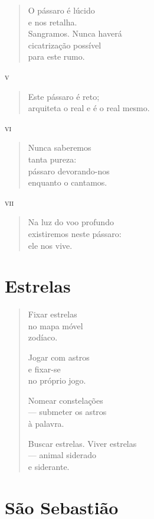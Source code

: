 \begin{verse}
O pássaro é lúcido\\
e nos retalha.\\
Sangramos. Nunca haverá\\
cicatrização possível\\
para este rumo.
\end{verse}

\medskip
\textsc{v}

\begin{verse}
Este pássaro é reto;\\
arquiteta o real e é o real mesmo.
\end{verse}

\medskip
\textsc{vi}

\begin{verse}
Nunca saberemos\\
tanta pureza:\\
pássaro devorando-nos\\
enquanto o cantamos.
\end{verse}

\medskip
\textsc{vii}

\begin{verse}
Na luz do voo profundo\\
existiremos neste pássaro:\\
ele nos vive.
\end{verse}

\chapter{Estrelas}

\begin{verse}
Fixar estrelas\\
no mapa móvel\\
zodíaco.

Jogar com astros\\
e fixar-se\\
no próprio jogo.

Nomear constelações\\
---  submeter os astros\\
à palavra.

Buscar estrelas. Viver estrelas\\
\qquad\qquad\quad --- animal siderado\\
\qquad\qquad\qquad\qquad e siderante.
\end{verse}

\chapter{São Sebastião}

